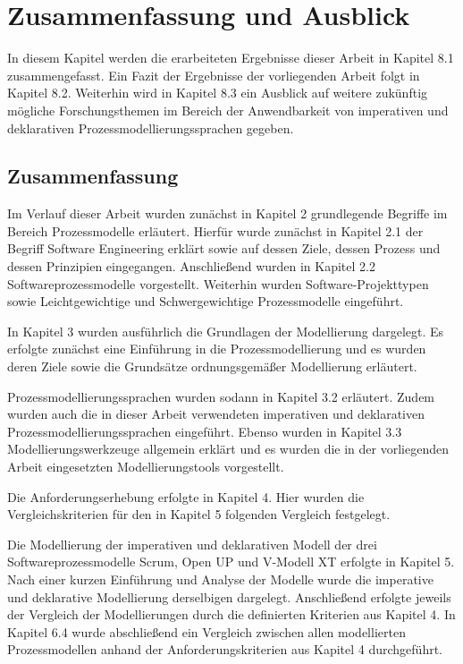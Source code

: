 \chapter{Zusammenfassung und Ausblick}\label{sec:chapter8}
 In diesem Kapitel werden die erarbeiteten Ergebnisse dieser Arbeit in Kapitel 8.1 zusammengefasst. Ein Fazit der Ergebnisse der vorliegenden Arbeit folgt in Kapitel 8.2. Weiterhin wird in Kapitel 8.3 ein Ausblick auf weitere zukünftig mögliche Forschungsthemen im Bereich der Anwendbarkeit von imperativen und deklarativen Prozessmodellierungssprachen gegeben.

\section{Zusammenfassung}

Im Verlauf dieser Arbeit wurden zunächst in Kapitel 2 grundlegende Begriffe im Bereich Prozessmodelle erläutert. Hierfür wurde zunächst in Kapitel 2.1 der Begriff Software Engineering erklärt sowie auf dessen Ziele, dessen Prozess und dessen Prinzipien eingegangen.\newline
Anschließend wurden in Kapitel 2.2 Softwareprozessmodelle vorgestellt. Weiterhin wurden Software-Projekttypen sowie Leichtgewichtige und Schwergewichtige Prozessmodelle eingeführt.\newline

In Kapitel 3 wurden ausführlich die Grundlagen der Modellierung dargelegt. Es erfolgte zunächst eine Einführung in die Prozessmodellierung und es wurden deren Ziele sowie die Grundsätze ordnungsgemäßer Modellierung erläutert.\newline

Prozessmodellierungssprachen wurden sodann in Kapitel 3.2 erläutert. Zudem wurden auch die in dieser Arbeit verwendeten imperativen und deklarativen Prozessmodellierungssprachen eingeführt.\newline
Ebenso wurden in Kapitel 3.3 Modellierungswerkzeuge allgemein erklärt und es wurden die in der vorliegenden Arbeit eingesetzten Modellierungstools vorgestellt.\newline

Die Anforderungserhebung erfolgte in Kapitel 4. Hier wurden die Vergleichskriterien für den in Kapitel 5 folgenden Vergleich  festgelegt.\newline

Die Modellierung der imperativen und deklarativen Modell der drei Softwareprozessmodelle Scrum, Open UP und V-Modell XT erfolgte in Kapitel 5. Nach einer kurzen Einführung und Analyse der Modelle wurde die imperative und deklarative Modellierung derselbigen dargelegt. Anschließend erfolgte jeweils der Vergleich der Modellierungen durch die definierten Kriterien aus Kapitel 4. In Kapitel 6.4 wurde abschließend ein Vergleich zwischen allen modellierten Prozessmodellen anhand der Anforderungskriterien aus Kapitel 4 durchgeführt. \newline

